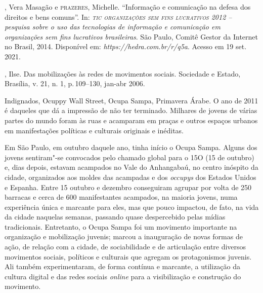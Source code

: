 \begin{bibliohedra}
, Vera Masagão e \textsc{prazeres}, Michelle. ``Informação e comunicação
na defesa dos direitos e bens comuns''. In: \emph{\textsc{tic organizações sem
fins lucrativos} 2012 -- pesquisa sobre o uso das tecnologias de
informação e comunicação em organizações sem fins lucrativos
brasileiras}. São Paulo, Comitê Gestor da Internet no Brasil, 2014.
Disponível em:
\emph{https://hedra.com.br/r/q5a}.
Acesso em 19 set. 2021.

, Ilse. Das mobilizações às redes de movimentos sociais.
Sociedade e Estado, Brasília, v. 21, n. 1, p.\,109--130, jan-abr 2006.
\end{bibliohedra}



\noindent{}Indignados, Ocuppy Wall Street, Ocupa Sampa, Primavera Árabe. O ano de
2011 é daqueles que dá a impressão de não ter terminado. Milhares de
jovens de várias partes do mundo foram às ruas e acamparam em praças e
outros espaços urbanos em manifestações políticas e culturais originais
e inéditas.

Em São Paulo, em outubro daquele ano, tinha início o Ocupa Sampa. Alguns
dos jovens sentiram"-se convocados pelo chamado global para o 15O (15 de
outubro) e, dias depois, estavam acampados no Vale do Anhangabaú, no
centro inóspito da cidade, organizados aos moldes das acampadas e dos
\emph{occupys} dos Estados Unidos e Espanha. Entre 15 outubro e dezembro
conseguiram agrupar por volta de 250 barracas e cerca de 600
manifestantes acampados, na maioria jovens, numa experiência única e
marcante para eles, mas que pouco impactou, de fato, na vida da cidade
naquelas semanas, passando quase despercebido pelas mídias tradicionais.
Entretanto, o Ocupa Sampa foi um movimento importante na organização e
mobilização juvenis; marcou a inauguração de novas formas de ação, de
relação com a cidade, de sociabilidade e de articulação entre diversos
movimentos sociais, políticos e culturais que agregam os protagonismos
juvenis. Ali também experimentaram, de forma contínua e marcante, a
utilização da cultura digital e das redes sociais \emph{online} para a
visibilização e construção do movimento.

